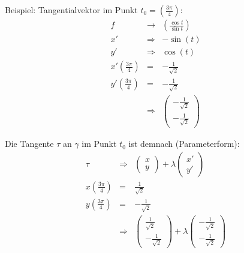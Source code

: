 Beispiel: Tangentialvektor im Punkt $t_0=\left( \frac{3\pi}{4}\right)$:
\begin{eqnarray*}
	f &\rightarrow& \left( \frac{\cos t}{\sin t} \right)\\
	x' &\Rightarrow& -\sin (t)\\
	y' &\Rightarrow& \cos (t) \\
	x'\left( \frac{3\pi}{4}\right) &=& -\frac{1}{\sqrt{2}}\\
	y'\left( \frac{3\pi}{4}\right) &=& -\frac{1}{\sqrt{2}}\\
	&\Rightarrow& \left(\begin{array}{c} -\frac{1}{\sqrt{2}} \\ -\frac{1}{\sqrt{2}} \end{array}\right)
\end{eqnarray*}

Die Tangente $\tau$ an $\gamma$ im Punkt $t_0$ ist demnach (Parameterform):
\begin{eqnarray*}
  \tau &\Rightarrow& \left(\begin{array}{c} x \\ y \end{array}\right) + \lambda  \left(\begin{array}{c} x' \\ y' \end{array}\right)\\
	x\left( \frac{3\pi}{4}\right) &=& \frac{1}{\sqrt{2}}\\
	y\left( \frac{3\pi}{4}\right) &=& -\frac{1}{\sqrt{2}}\\
	&\Rightarrow& \left(\begin{array}{c} \frac{1}{\sqrt{2}} \\ -\frac{1}{\sqrt{2}} \end{array}\right) + \lambda  \left(\begin{array}{c} -\frac{1}{\sqrt{2}} \\ -\frac{1}{\sqrt{2}} \end{array}\right)\\
\end{eqnarray*}    


